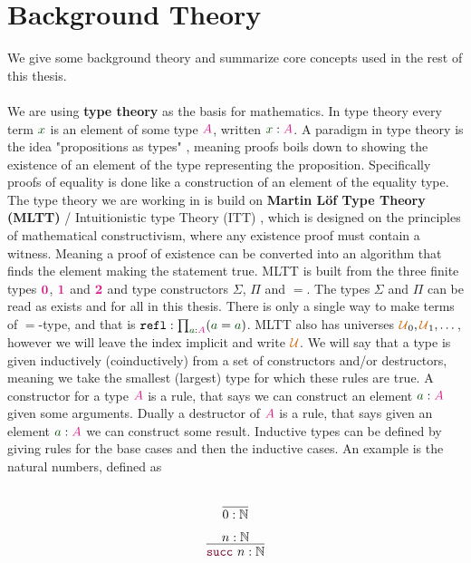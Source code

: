\documentclass[twoside,11pt,openright]{report}
\theoremstyle{plain} %
\theoremstyle{definition}
\theoremstyle{remark}
\newcommand*{\term}[1]{\textcolor{green!30!black}{#1}} %
\newcommand*{\type}[1]{\textcolor{magenta!90!black}{#1}}
\newcommand*{\universe}[1]{\textcolor{orange!80!black}{#1}}
\newcommand*{\unit}{\type{\textbf{1}}}
\newcommand*{\empt}{\type{\textbf{0}}}
\newcommand*{\constructor}[1]{\textcolor{purple!60!black}{\ensuremath{\mathtt{#1}}}}
\begin{document}
\section{Background Theory}
We give some background theory and summarize core concepts used in the rest of this thesis. 
\\ \\
We are using \textbf{type theory} \cite{nlab:type_theory} as the basis for mathematics. In type theory every term \(\term{x}\) is an element of some type \(\type{A}\), written \(\term{x} : \type{A}\). A paradigm in type theory is the idea "propositions as types" \cite{nlab:propositions_as_types}, meaning proofs boils down to showing the existence of an element of the type representing the proposition. Specifically proofs of equality is done like a construction of an element of the equality type. The type theory we are working in is build on \textbf{Martin L\"of Type Theory (MLTT)} / Intuitionistic type Theory (ITT) \cite{nlab:martin-loef_dependent_type_theory}, which is designed on the principles of mathematical constructivism, where any existence proof must contain a witness. Meaning a proof of existence can be converted into an algorithm that finds the element making the statement true. MLTT is built from the three finite types \(\empt\), \(\unit\) and \(\type{\mathbf{2}}\) and type constructors \(\Sigma\), \(\Pi\) and \(=\). The types \(\Sigma\) and \(\Pi\) can be read as exists and for all in this thesis. There is only a single way to make terms of \(=\)-type, and that is \(\mathtt{refl} : \prod_{\term{a} : \type{A}} (\term{a} = \term{a})\). MLTT also has universes \(\universe{\mathcal{U}}_0, \universe{\mathcal{U}}_1, \dots\), however we will leave the index implicit and write \(\universe{\mathcal{U}}\).  We will say that a type is given inductively (coinductively) from a set of constructors and/or destructors, meaning we take the smallest (largest) type for which these rules are true. A constructor for a type \(\type{A}\) is a rule, that says we can construct an element \(\term{a} : \type{A}\) given some arguments. Dually a destructor of \(\type{A}\) is a rule, that says given an element \(\term{a} : \type{A}\) we can construct some result. Inductive types can be defined by giving rules for the base cases and then the inductive cases. An example is the natural numbers, defined as\\[-10mm]
\begin{center}
  \strut
  \hfill
  \begin{minipage}{0.15\linewidth}
    \begin{equation}
      \vcenter{\infer{0 : \mathbb{N}}{\strut}}
    \end{equation}
  \end{minipage}
  \hfill
  \begin{minipage}{0.20\linewidth}
    \begin{equation}
      \vcenter{\infer{\constructor{succ}~n : \mathbb{N}}{n : \mathbb{N}}}
    \end{equation}
  \end{minipage}
  \hfill
  \strut
\end{center}
\end{document}
